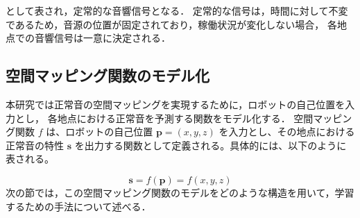 \documentclass[../main]{subfiles}
\begin{document}
として表され，定常的な音響信号となる．
定常的な信号は，時間に対して不変であるため，音源の位置が固定されており，稼働状況が変化しない場合，
各地点での音響信号は一意に決定される．

\subsection{空間マッピング関数のモデル化}
本研究では正常音の空間マッピングを実現するために，ロボットの自己位置を入力とし，
各地点における正常音を予測する関数をモデル化する．
空間マッピング関数 \( f \) は、ロボットの自己位置 \( \mathbf{p} = (x, y, z) \) を入力とし、その地点における正常音の特性 \( \mathbf{s} \) を出力する関数として定義される。具体的には、以下のように表される。

\begin{equation}
  \mathbf{s} = f(\mathbf{p}) = f(x, y, z)
\end{equation}
次の節では，この空間マッピング関数のモデルをどのような構造を用いて，学習するための手法について述べる．

\label{sec:pmethod_mapping}
\end{document}
